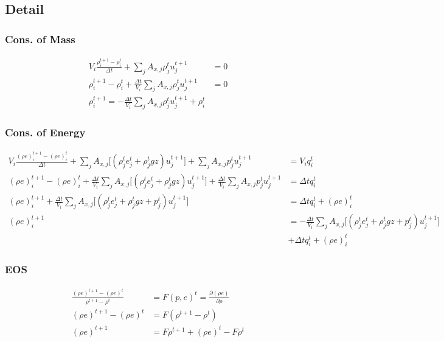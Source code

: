 \documentclass[11pt,letterpaper,notitlepage]{article}
\newcommand{\beqn}{\begin{equation}
		\begin{aligned}}
\newcommand{\eeqn}{\end{aligned}
\end{equation}}
\numberwithin{equation}{section}
\begin{document}
\subsection{Detail}
\subsubsection{Cons. of Mass}
\beqn 
V_i\frac{\rho_i^{t+1} - \rho_i^t}{\Delta t} + \sum_j A_{x,j} \rho_j^t u_j^{t+1}  &= 0 
\\
\rho_i^{t+1} - \rho_i^t + \frac{\Delta t}{V_i} \sum_j A_{x,j} \rho_j^t u_j^{t+1} &= 0
\\
\rho_i^{t+1} = - \frac{\Delta t}{V_i} \sum_j A_{x,j} \rho_j^t u_j^{t+1} + \rho_i^t
\eeqn

\subsubsection{Cons. of Energy}
\beqn 
V_i\frac{(\rho e)_i^{t+1}-(\rho e)_i^t}{\Delta t} + 
\sum_j A_{x,j} \biggr[(\rho_j^t e_j^t + \rho_j^t gz)u_j^{t+1}\biggr] +
\sum_j A_{x,j} p_j^t u_j^{t+1} &= V_i q_i^t
\\
(\rho e)_i^{t+1}-(\rho e)_i^t + 
\frac{\Delta t}{V_i} \sum_j A_{x,j} \biggr[(\rho_j^t e_j^t + \rho_j^t gz)u_j^{t+1}\biggr] +
\frac{\Delta t}{V_i}\sum_j A_{x,j} p_j^t u_j^{t+1} &= \Delta t q_i^t
\\
(\rho e)_i^{t+1} + 
\frac{\Delta t}{V_i} \sum_j A_{x,j} \biggr[(\rho_j^t e_j^t + \rho_j^t gz + p_j^t)u_j^{t+1}\biggr] 
&= \Delta t q_i^t+(\rho e)_i^t
\\
(\rho e)_i^{t+1} &=
- \frac{\Delta t}{V_i} \sum_j A_{x,j} \biggr[(\rho_j^t e_j^t + \rho_j^t gz + p_j^t)u_j^{t+1}\biggr] 
\\ &+ \Delta t q_i^t+(\rho e)_i^t
\eeqn 

\subsubsection{EOS}
\beqn 
\frac{(\rho e)^{t+1} - (\rho e)^t}{\rho^{t+1}-\rho^t} &= F(p, e)^t = \frac{\partial (\rho e)}{\partial \rho} \\
(\rho e)^{t+1} - (\rho e)^t &= F(\rho^{t+1}-\rho^t) \\
(\rho e)^{t+1} &= F\rho^{t+1} + (\rho e)^t - F\rho^t
\eeqn 
\end{document}

